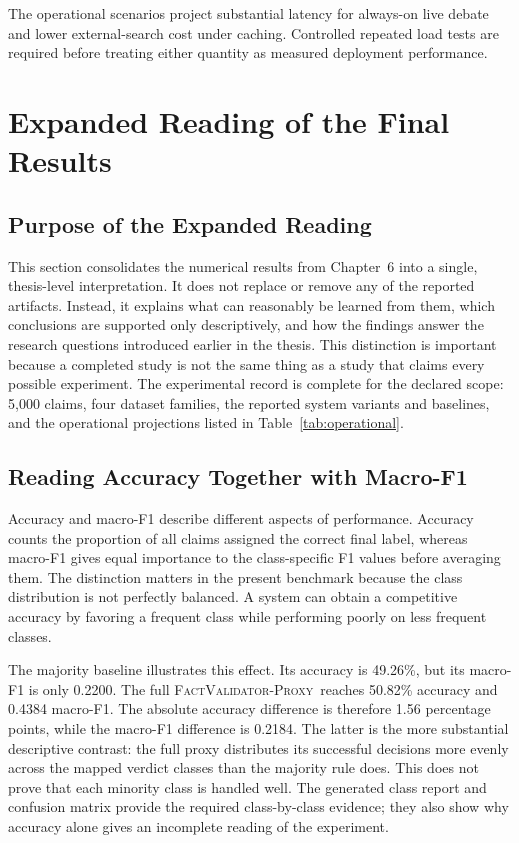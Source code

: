 \documentclass[12pt,a4paper,openany]{report}
\newcommand{\proxy}{\textsc{FactValidator-Proxy}}
\begin{document}
The operational scenarios project substantial latency for always-on live debate and lower external-search cost under caching. Controlled repeated load tests are required before treating either quantity as measured deployment performance.

\section{Expanded Reading of the Final Results}
\label{ch:expanded-reading}

\subsection{Purpose of the Expanded Reading}
This section consolidates the numerical results from Chapter~6 into a
single, thesis-level interpretation. It does not replace or remove any of the
reported artifacts. Instead, it explains what can reasonably be learned
from them, which conclusions are supported only descriptively, and how the
findings answer the research questions introduced earlier in the thesis. This
distinction is important because a completed study is not the same thing as a
study that claims every possible experiment. The experimental record is
complete for the declared scope: 5{,}000 claims, four dataset families, the
reported system variants and baselines, and the operational projections
listed in Table~\ref{tab:operational}.

\subsection{Reading Accuracy Together with Macro-F1}
Accuracy and macro-F1 describe different aspects of performance. Accuracy
counts the proportion of all claims assigned the correct final label, whereas
macro-F1 gives equal importance to the class-specific F1 values before
averaging them. The distinction matters in the present benchmark because the
class distribution is not perfectly balanced. A system can obtain a
competitive accuracy by favoring a frequent class while performing poorly on
less frequent classes.

The majority baseline illustrates this effect. Its accuracy is 49.26\%, but
its macro-F1 is only 0.2200. The full \proxy\ reaches 50.82\%
accuracy and 0.4384 macro-F1. The absolute accuracy difference is therefore
1.56 percentage points, while the macro-F1 difference is 0.2184. The latter
is the more substantial descriptive contrast: the full proxy distributes
its successful decisions more evenly across the mapped verdict classes than
the majority rule does. This does not prove that each minority class is
handled well. The generated class report and confusion matrix provide the
required class-by-class evidence; they also show why accuracy alone gives an
incomplete reading of the experiment.
\end{document}
